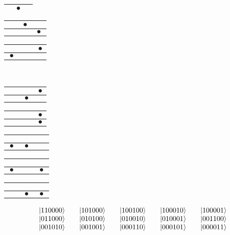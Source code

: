 \begin{frame}[t]
\begin{center}
\begin{tabular}{|c|c|c|}
  & $\bullet$ &  \\
  \hline
  \end{tabular}
  \begin{tabular}{|c|c|c|}
  \hline
  $\phantom{\bullet}$ & $\bullet$ & $\phantom{\bullet}$ \\ \hline
  &  & $\bullet$ \\
  \hline
  \end{tabular}
  \begin{tabular}{|c|c|c|}
  \hline
  $\phantom{\bullet}$ & $\phantom{\bullet}$ & $\bullet$ \\ \hline
  $\bullet$ &  &  \\
  \hline
  \end{tabular} \\
  \vspace{0.5em}
  \begin{tabular}{|c|c|c|}
  \hline
  $\phantom{\bullet}$ & $\phantom{\bullet}$ & $\bullet$ \\ \hline
  & $\bullet$ &  \\
  \hline
  \end{tabular}
  \begin{tabular}{|c|c|c|}
  \hline
  $\phantom{\bullet}$ & $\phantom{\bullet}$ & $\bullet$ \\ \hline
  &  & $\bullet$ \\
  \hline
  \end{tabular}
  \begin{tabular}{|c|c|c|}
  \hline
  $\phantom{\bullet}$ & $\phantom{\bullet}$ & $\phantom{\bullet}$ \\ \hline
  $\bullet$ & $\bullet$ &  \\
  \hline
  \end{tabular}
  \begin{tabular}{|c|c|c|}
  \hline
  $\phantom{\bullet}$ & $\phantom{\bullet}$ & $\phantom{\bullet}$ \\ \hline
  $\bullet$ &  & $\bullet$ \\
  \hline
  \end{tabular}
  \begin{tabular}{|c|c|c|}
  \hline
  $\phantom{\bullet}$ & $\phantom{\bullet}$ & $\phantom{\bullet}$ \\ \hline
  & $\bullet$ & $\bullet$ \\
  \hline
  \end{tabular}
  \end{center}
  \begin{equation*}
  \begin{array}{c c c c c c c c c}
  \Ket{110000} & & \Ket{101000} & & \Ket{100100} & & \Ket{100010} & & \Ket{100001} \\
  \Ket{011000} & & \Ket{010100} & & \Ket{010010} & & \Ket{010001} & & \Ket{001100} \\
  \Ket{001010} & & \Ket{001001} & & \Ket{000110} & & \Ket{000101} & & \Ket{000011}
  \end{array}
  \end{equation*}
\end{frame}

